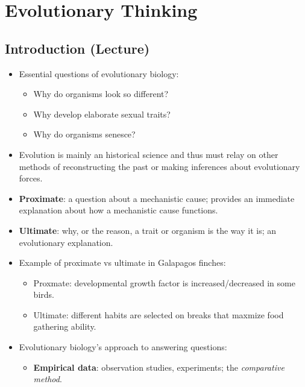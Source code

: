 \documentclass[12pt,a4paper]{article}
\begin{document}
\tableofcontents
\cleardoublepage
\fancyhead{}

\clearpage
\section{Evolutionary Thinking}
\subsection{Introduction (Lecture)}
\begin{itemize}
    \item Essential questions of evolutionary biology: 
        \begin{itemize}
            \item Why do organisms look so different?
            \item Why develop elaborate sexual traits?
            \item Why do organisms senesce?
        \end{itemize}
    \item Evolution is mainly an historical science and thus must relay on other methods of reconstructing the past or making inferences about evolutionary forces. 
    \item \textbf{Proximate}: a question about a mechanistic cause; provides an immediate explanation about {\color{o-Sun}how} a mechanistic cause functions.
    \item \textbf{Ultimate}: {\color{o-Sun}why}, or the reason, a trait or organism is the way it is; an evolutionary explanation.
    \item Example of proximate vs ultimate in Galapagos finches: 
        \begin{itemize}
            \item Proxmate: developmental growth factor is increased/decreased in some birds.
            \item Ultimate: different habits are selected on breaks that maxmize food gathering ability.
        \end{itemize}
    \item Evolutionary biology's approach to answering questions:
        \begin{itemize}
            \item \textbf{Empirical data}: {\color{o-Sun}observation} studies, experiments; the \textit{comparative method}.

\end{itemize}
\end{itemize}
\end{document}
